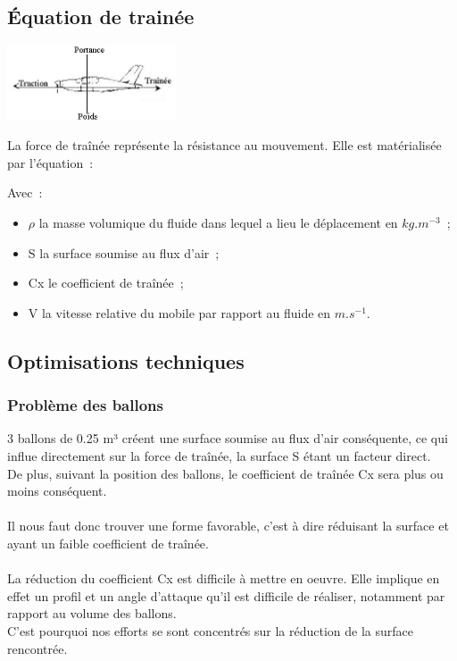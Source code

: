 \documentclass[a4paper,11pt]{article}
\begin{document}
\subsection{Équation de trainée}
	\begin{center}
		\includegraphics[width=5cm]{../Images/portance.jpg}
	\end{center}
	La force de traînée représente la résistance au mouvement. Elle est matérialisée par l'équation~:\\
  \begin{center}
  \end{center}
  Avec~:
  \begin{itemize}
   \item $\rho$ la masse volumique du fluide dans lequel a lieu le déplacement en $kg.m^{-3}$~;
   \item S la surface soumise au flux d'air~;
   \item Cx le coefficient de traînée~;
   \item V la vitesse relative du mobile par rapport au fluide en $m.s^{-1}$.
  \end{itemize}

\subsection{Optimisations techniques}
\subsubsection{Problème des ballons}
	3 ballons de 0.25 m³ créent une surface soumise au flux d'air conséquente, ce qui influe directement sur la force de traînée, la surface S étant un facteur direct.\\
	De plus, suivant la position des ballons, le coefficient de traînée Cx sera plus ou moins conséquent.\\
	\\
	Il nous faut donc trouver une forme favorable, c'est à dire réduisant la surface et ayant un faible coefficient de traînée.\\
	\\
	La réduction du coefficient Cx est difficile à mettre en oeuvre. Elle implique en effet un profil et un angle d'attaque qu'il est difficile de réaliser, notamment par rapport au volume des ballons.\\
	C'est pourquoi nos efforts se sont concentrés sur la réduction de la surface rencontrée.
\end{document}
